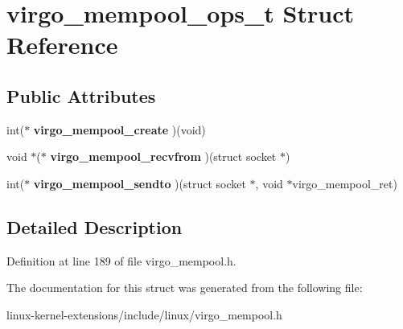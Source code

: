 \hypertarget{structvirgo__mempool__ops__t}{\section{virgo\-\_\-mempool\-\_\-ops\-\_\-t Struct Reference}
\label{structvirgo__mempool__ops__t}
}
\subsection*{Public Attributes}
\begin{DoxyCompactItemize}
\item 
\hypertarget{structvirgo__mempool__ops__t_a3743ef6d73bfa9c34d9634b1338be181}{int($\ast$ {\bfseries virgo\-\_\-mempool\-\_\-create} )(void)}\label{structvirgo__mempool__ops__t_a3743ef6d73bfa9c34d9634b1338be181}

\item 
\hypertarget{structvirgo__mempool__ops__t_a5d4cecbdabaf63da43422835beea3fe9}{void $\ast$($\ast$ {\bfseries virgo\-\_\-mempool\-\_\-recvfrom} )(struct socket $\ast$)}\label{structvirgo__mempool__ops__t_a5d4cecbdabaf63da43422835beea3fe9}

\item 
\hypertarget{structvirgo__mempool__ops__t_af6a637aceb9dc1041f7027cd309112d5}{int($\ast$ {\bfseries virgo\-\_\-mempool\-\_\-sendto} )(struct socket $\ast$, void $\ast$virgo\-\_\-mempool\-\_\-ret)}\label{structvirgo__mempool__ops__t_af6a637aceb9dc1041f7027cd309112d5}

\end{DoxyCompactItemize}


\subsection{Detailed Description}


Definition at line 189 of file virgo\-\_\-mempool.\-h.



The documentation for this struct was generated from the following file\-:\begin{DoxyCompactItemize}
\item 
linux-\/kernel-\/extensions/include/linux/virgo\-\_\-mempool.\-h\end{DoxyCompactItemize}
